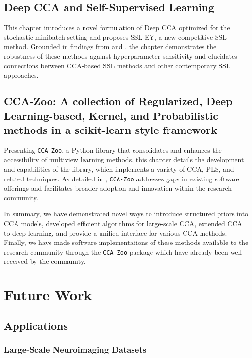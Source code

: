 \subsection{Deep CCA and Self-Supervised
Learning}
This chapter introduces a novel formulation of Deep CCA optimized for the stochastic minibatch setting and proposes SSL-EY, a new competitive SSL method. Grounded in findings from \citep{chapman2023cca} and \citep{chapman2023efficient}, the chapter demonstrates the robustness of these methods against hyperparameter sensitivity and elucidates connections between CCA-based SSL methods and other contemporary SSL approaches.

\subsection{CCA-Zoo: A collection of
Regularized, Deep
Learning-based, Kernel, and
Probabilistic methods in a
scikit-learn style framework}
Presenting \texttt{CCA-Zoo}, a Python library that consolidates and enhances the accessibility of multiview learning methods, this chapter details the development and capabilities of the library, which implements a variety of CCA, PLS, and related techniques. As detailed in \citep{chapman2021cca}, \texttt{CCA-Zoo} addresses gaps in existing software offerings and facilitates broader adoption and innovation within the research community.

In summary, we have demonstrated novel ways to introduce structured priors into CCA models, developed efficient algorithms for large-scale CCA, extended CCA to deep learning, and provide a unified interface for various CCA methods. Finally, we have made software implementations of these methods available to the research community through the \texttt{CCA-Zoo} package which have already been well-received by the community.

\section{Future Work}

\subsection{Applications}

\subsubsection{Large-Scale Neuroimaging Datasets}

